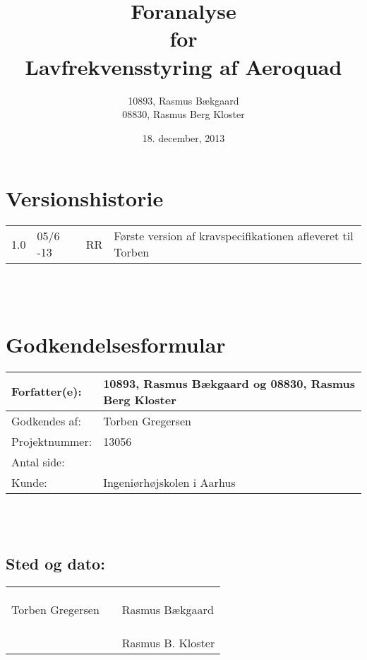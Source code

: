 \documentclass[oneside, 12pt]{memoir}
\title{Foranalyse \\ for \\ Lavfrekvensstyring af Aeroquad}
\date{18. december, 2013}
\author{10893, Rasmus Bækgaard\\08830, Rasmus Berg Kloster}
\begin{document}
\begin{titlingpage}
  \maketitle
\end{titlingpage}


\section*{Versionshistorie}
\begin{tabular}{l|l|l|l}
1.0 & 05/6 -13 & RR & Første version af kravspecifikationen afleveret til Torben 
\end{tabular} 
\\
\\
\section*{Godkendelsesformular}
\begin{tabular}{l|l}
\hline 
Forfatter(e): & 10893, Rasmus Bækgaard og 08830, Rasmus Berg Kloster\\ 
\hline 
Godkendes af: & Torben Gregersen \\ 
\hline
Projektnummer: & 13056\\
\hline
Antal side: & \pageref{LastPage} \\
\hline 
Kunde: & Ingeniørhøjskolen i Aarhus \\
\hline
\end{tabular} 
\\
\\
\subsection*{Sted og dato:}
\begin{tabular}{lll}
&& \\
&& \\
\underline{\qquad \qquad \qquad \qquad \qquad} & \qquad \qquad \qquad & \underline{\qquad \qquad \qquad \qquad \qquad}  \\ 
Torben Gregersen & & Rasmus Bækgaard \\ \\\\
&&  \underline{\qquad \qquad \qquad \qquad \qquad}  \\
& & Rasmus B. Kloster
\end{tabular} 




\newpage
\tableofcontents*
\newpage
\listoffixmes 








\newpage
\appendix

\nocite{*}


\end{document}
